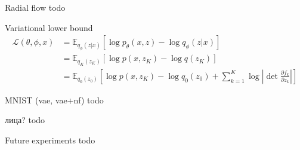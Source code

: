 \documentclass[unicode,11pt]{beamer}
\begin{document}
\begin{frame}[fragile]{Radial flow}
todo

\end{frame}


\begin{frame}[fragile]{Variational lower bound}
\begin{align*} 
\mathcal{L}(\theta, \phi, x) &= \mathbb{E}_{q_\phi(z|x)} \left[ \log p_\theta(x, z) - \log q_\phi(z | x) \right] \\
&= \mathbb{E}_{q_K(z_K)} \left[ \log p(x, z_K) - \log q(z_K) \right] \\
&= \mathbb{E}_{q_0(z_0)} \left[ \log p(x, z_K) - \log q_0(z_0) + \sum_{k=1}^K \log \left\vert \det \frac{\partial f_k}{\partial z_k} \right\vert \right] 
\end{align*} 
\end{frame}


\begin{frame}[fragile]{MNIST (vae, vae+nf)}
todo
\end{frame}

\begin{frame}[fragile]{лица?}
todo
\end{frame}

\begin{frame}[fragile]{Future experiments}
todo 
\end{frame}
\end{document}
